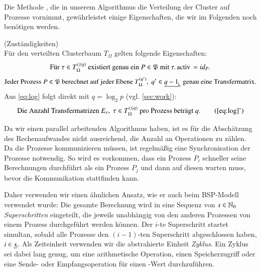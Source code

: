   Die Methode , die in unserem Algorithmus die Verteilung der Cluster auf Prozesse vornimmt, gewährleistet einige Eigenschaften, die wir im Folgenden noch benötigen
  werden.
  
  \begin{bem}
    (Zuständigkeiten)\\
    Für den verteilten Clusterbaum $T_\Omega$ gelten folgende Eigenschaften:
    \begin{equation}
      \text{Für } \tau \in T_\Omega^{(\geq q)} \text{ existiert genau ein } P \in \Proc \text{ mit } \tau.\tcode{activ} = id_P.
    \end{equation}
    \begin{equation}
      \text{Jeder Prozess } P \in \Proc \text{ berechnet auf jeder Ebene } T_\Omega^{(q')}, \ q' \in \nullhaken{q-1} \text{ genau eine Transfermatrix.}\label{eq:log}
    \end{equation}\newline
    Aus \autoref{eq:log} folgt direkt mit $q = \log_2 p$ (vgl. \autoref{sec:work}):
    \begin{equation}
      \text{Die Anzahl Transfermatrizen } E_\tau, \ \tau \in T_\Omega^{(\leq q)} \text{ pro Prozess beträgt } q.\tag{\ref{eq:log}'}
    \end{equation}
  \end{bem}

  Da wir einen parallel arbeitenden Algorithmus haben, ist es für die Abschätzung des Rechenaufwandes nicht ausreichend, die Anzahl an Operationen zu zählen. Da die Prozesse kommunizieren müssen, ist 
  regelmäßig eine Synchronisation der Prozesse notwendig. So wird es vorkommen, dass ein Prozess $P_i$ schneller seine Berechnungen durchführt als ein Prozess $P_j$ und dann auf diesen warten muss,
  bevor die Kommunikation stattfinden kann. 
  
  Daher verwenden wir einen ähnlichen Ansatz, wie er auch beim BSP-Modell \citep{bsp} verwendet wurde: Die gesamte Berechnung wird in eine Sequenz von $s \in \mathbb{N}_0$ \textit{Superschritten} eingeteilt,
  die jeweils unabhängig von den anderen Prozessen von einem Prozess durchgeführt werden können. Der $i$-te Superschritt startet simultan, sobald alle Prozesse den $(i-1)$-ten Superschritt abgeschlossen
  haben, $i \in \haken{s}$. Als Zeiteinheit verwenden wir die abstrahierte Einheit \textit{Zyklus}. Ein Zyklus sei dabei lang genug, um eine arithmetische Operation, einen Speicherzugriff oder eine 
  Sende- oder Empfangsoperation für einen -Wert durchzuführen.
  
